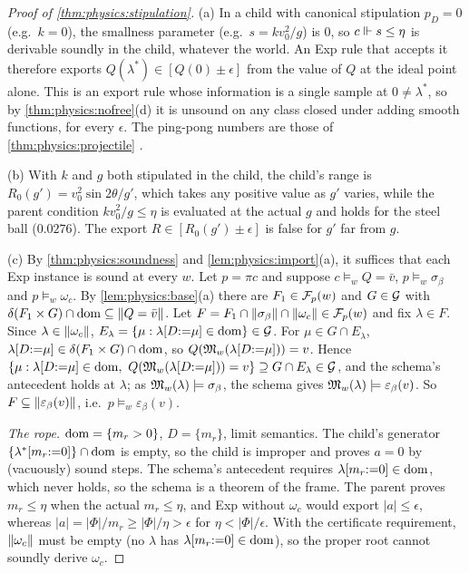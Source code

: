 \begin{proof}[Proof of \cref{thm:physics:stipulation}]
(a) In a child with canonical stipulation $p_D=0$ (e.g.\ $k=0$), the smallness parameter
(e.g.\ $s=kv_0^2/g$) is $0$, so $c\Vdash s\le\eta$ is derivable soundly in the child, whatever
the world. An Exp rule that accepts it therefore exports $Q(\lambda^*)\in[Q(0)\pm\epsilon]$
from the value of $Q$ at the ideal point alone. This is an export rule whose information is a
single sample at $0\neq\lambda^*$, so by \cref{thm:physics:nofree}(d) it is unsound on any
class closed under adding smooth functions, for every $\epsilon$. The ping-pong numbers are
those of \cref{thm:physics:projectile} .

(b) With $k$ and $g$ both stipulated in the child, the child's range is
$R_0(g')=v_0^2\sin2\theta/g'$, which takes any positive value as $g'$ varies, while the
parent condition $kv_0^2/g\le\eta$ is evaluated at the actual $g$ and holds for the steel ball
($0.0276$). The export $R\in[R_0(g')\pm\epsilon]$ is false for $g'$ far from $g$.

(c) By \cref{thm:physics:soundness} and \cref{lem:physics:import}(a), it suffices that each
Exp instance is sound at every $w$. Let $p=\pi c$ and suppose $c\models_w Q=\bar v$,
$p\models_w\sigma_\beta$ and $p\models_w\omega_c$. By \cref{lem:physics:base}(a) there are
$F_1\in\mathcal{F}_p(w)$ and $G\in\mathcal{G}$ with $\delta(F_1\times G)\cap\operatorname{dom}\subseteq\lVert Q=\bar v\rVert$. Let
$F=F_1\cap\lVert \sigma_\beta\rVert\cap\lVert \omega_c\rVert\in\mathcal{F}_p(w)$ and fix $\lambda\in F$. Since
$\lambda\in\lVert \omega_c\rVert$, $E_\lambda=\{\mu:\lambda[D{:=}\mu]\in\operatorname{dom}\}\in\mathcal{G}$. For
$\mu\in G\cap E_\lambda$, $\lambda[D{:=}\mu]\in\delta(F_1\times G)\cap\operatorname{dom}$, so
$Q(\mathfrak{M}_w(\lambda[D{:=}\mu]))=v$. Hence
$\{\mu:\lambda[D{:=}\mu]\in\dom,\ Q(\fM_w(\lambda[D{:=}\mu]))=v\}\supseteq G\cap E_\lambda\in\fG$,
and the schema's antecedent holds at $\lambda$; as $\mathfrak{M}_w(\lambda)\models\sigma_\beta$, the
schema gives $\mathfrak{M}_w(\lambda)\models\varepsilon_\beta(v)$. So
$F\subseteq\lVert \varepsilon_\beta(v)\rVert$, i.e.\ $p\models_w\varepsilon_\beta(v)$.

\emph{The rope.} $\operatorname{dom}=\{m_r>0\}$, $D=\{m_r\}$, limit semantics. The child's generator
$\{\lambda^*[m_r{:=}0]\}\cap\operatorname{dom}$ is empty, so the child is improper and proves $a=0$ by
(vacuously) sound steps. The schema's antecedent requires $\lambda[m_r{:=}0]\in\operatorname{dom}$, which
never holds, so the schema is a theorem of the frame. The parent proves $m_r\le\eta$ when
the actual $m_r\le\eta$, and Exp without $\omega_c$ would export $|a|\le\epsilon$, whereas
$|a|=|\Phi|/m_r\ge|\Phi|/\eta>\epsilon$ for $\eta<|\Phi|/\epsilon$. With the certificate
requirement, $\lVert \omega_c\rVert$ must be empty (no $\lambda$ has $\lambda[m_r{:=}0]\in\operatorname{dom}$),
so the proper root cannot soundly derive $\omega_c$.
\end{proof}


